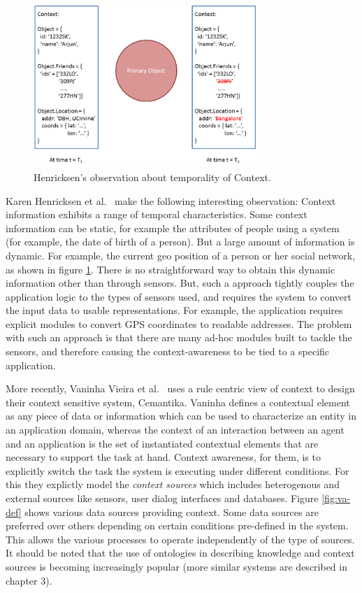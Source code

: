 \begin{figure}[t]
\centering
\includegraphics[width=0.75\textwidth]{media/chapter2/ka-obs.png}
\caption{Henricksen's observation about temporality of Context.}
\label{fig:karen-obs}
\end{figure}

Karen Henricksen et al.\ \cite{henricksen2002modeling} make the following interesting observation: Context information exhibits a range of temporal characteristics. Some context information can be static, for example the attributes of people using a system (for example, the date of birth of a person). But a large amount of information is dynamic. For example, the current geo position of a person or her social network, as shown in figure \ref{fig:karen-obs}. There is no straightforward way to obtain this dynamic information other than through sensors. But, such a approach tightly couples the application logic to the types of sensors used, and requires the system to convert the input data to usable representations. For example, the application requires explicit modules to convert GPS coordinates to readable addresses. The problem with such an approach is that there are many ad-hoc modules built to tackle the sensors, and therefore causing the context-awareness to be tied to a specific application.

More recently, Vaninha Vieira et al.\ \cite{vieira2011designing} uses a rule centric view of context to design their context sensitive system, Cemantika. Vaninha defines a contextual element as any piece of data or information which can be used to characterize an entity in an application domain, whereas the context of an interaction between an agent and an application is the set of instantiated contextual elements that are necessary to support the task at hand. Context awareness, for them, is to explicitly switch the task the system is executing under different conditions. For this they explictly model the \textit{context sources} which includes heterogenous and  external sources like sensors, user dialog interfaces and databases. Figure \ref{fig:va-def} shows various data sources providing context. Some data sources are preferred over others depending on certain conditions pre-defined in the system. This allows the various processes to operate independently of the type of sources. It should be noted that the use of ontologies in describing knowledge and context sources is becoming increasingly popular (more similar systems are described in chapter 3).

